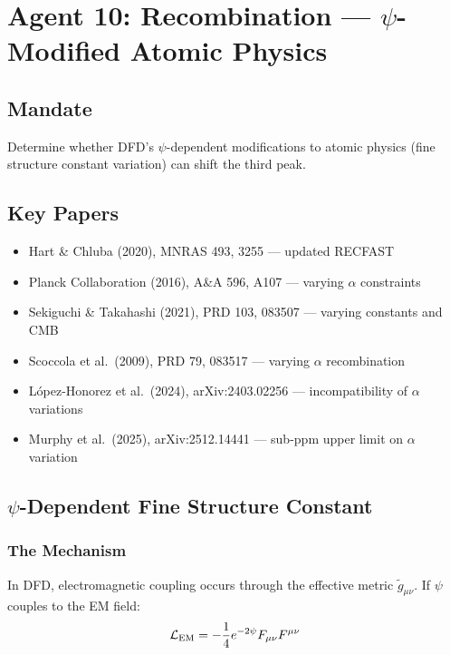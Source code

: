 \documentclass[11pt,a4paper]{article}
\begin{document}
\newpage
\section{Agent 10: Recombination --- $\psi$-Modified Atomic Physics}
\label{sec:agent10}

\subsection{Mandate}

Determine whether DFD's $\psi$-dependent modifications to atomic physics (fine structure constant variation) can shift the third peak.

\subsection{Key Papers}

\begin{itemize}
\item Hart \& Chluba (2020), MNRAS 493, 3255 --- updated RECFAST
\item Planck Collaboration (2016), A\&A 596, A107 --- varying $\alpha$ constraints
\item Sekiguchi \& Takahashi (2021), PRD 103, 083507 --- varying constants and CMB
\item Scoccola et al.\ (2009), PRD 79, 083517 --- varying $\alpha$ recombination
\item L\'{o}pez-Honorez et al.\ (2024), arXiv:2403.02256 --- incompatibility of $\alpha$ variations
\item Murphy et al.\ (2025), arXiv:2512.14441 --- sub-ppm upper limit on $\alpha$ variation
\end{itemize}

\subsection{$\psi$-Dependent Fine Structure Constant}

\subsubsection{The Mechanism}

In DFD, electromagnetic coupling occurs through the effective metric $\tilde{g}_{\mu\nu}$. If $\psi$ couples to the EM field:
\begin{equation}
\mathcal{L}_{\rm EM} = -\frac{1}{4}e^{-2\psi}F_{\mu\nu}F^{\mu\nu}
\end{equation}
\end{document}

